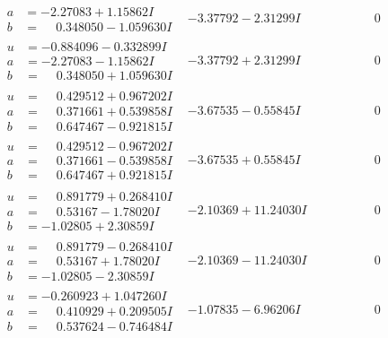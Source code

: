\documentclass[1p]{elsarticle_modified}
\theoremstyle{definition}
\begin{document}
$$\begin{array}{c|c|c}
\begin{aligned}
a &= -2.27083 + 1.15862 I \\
b &= \phantom{-}0.348050 - 1.059630 I\end{aligned}
 & -3.37792 - 2.31299 I & \phantom{-0.000000 } 0 \\ \hline\begin{aligned}
u &= -0.884096 - 0.332899 I \\
a &= -2.27083 - 1.15862 I \\
b &= \phantom{-}0.348050 + 1.059630 I\end{aligned}
 & -3.37792 + 2.31299 I & \phantom{-0.000000 } 0 \\ \hline\begin{aligned}
u &= \phantom{-}0.429512 + 0.967202 I \\
a &= \phantom{-}0.371661 + 0.539858 I \\
b &= \phantom{-}0.647467 - 0.921815 I\end{aligned}
 & -3.67535 - 0.55845 I & \phantom{-0.000000 } 0 \\ \hline\begin{aligned}
u &= \phantom{-}0.429512 - 0.967202 I \\
a &= \phantom{-}0.371661 - 0.539858 I \\
b &= \phantom{-}0.647467 + 0.921815 I\end{aligned}
 & -3.67535 + 0.55845 I & \phantom{-0.000000 } 0 \\ \hline\begin{aligned}
u &= \phantom{-}0.891779 + 0.268410 I \\
a &= \phantom{-}0.53167 - 1.78020 I \\
b &= -1.02805 + 2.30859 I\end{aligned}
 & -2.10369 + 11.24030 I & \phantom{-0.000000 } 0 \\ \hline\begin{aligned}
u &= \phantom{-}0.891779 - 0.268410 I \\
a &= \phantom{-}0.53167 + 1.78020 I \\
b &= -1.02805 - 2.30859 I\end{aligned}
 & -2.10369 - 11.24030 I & \phantom{-0.000000 } 0 \\ \hline\begin{aligned}
u &= -0.260923 + 1.047260 I \\
a &= \phantom{-}0.410929 + 0.209505 I \\
b &= \phantom{-}0.537624 - 0.746484 I\end{aligned}
 & -1.07835 - 6.96206 I & \phantom{-0.000000 } 0 \\ \hline\begin{aligned}

\end{aligned}
\end{array}$$
\end{document}
